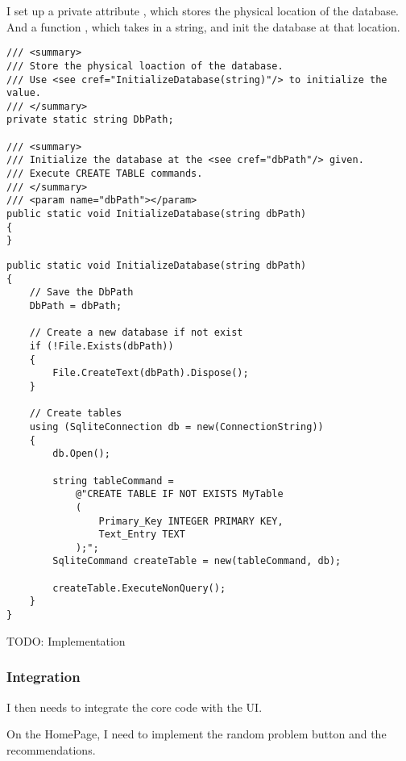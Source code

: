 \documentclass[report.tex]{subfiles}
\begin{document}
I set up a private attribute , which stores the physical location of the database. And a function , which takes in a string, and init the database at that location.

\begin{verbatim}
/// <summary>
/// Store the physical loaction of the database.
/// Use <see cref="InitializeDatabase(string)"/> to initialize the value.
/// </summary>
private static string DbPath;

/// <summary>
/// Initialize the database at the <see cref="dbPath"/> given.
/// Execute CREATE TABLE commands.
/// </summary>
/// <param name="dbPath"></param>
public static void InitializeDatabase(string dbPath)
{
}
\end{verbatim}

\begin{verbatim}
public static void InitializeDatabase(string dbPath)
{
    // Save the DbPath
    DbPath = dbPath;

    // Create a new database if not exist
    if (!File.Exists(dbPath))
    {
        File.CreateText(dbPath).Dispose();
    }

    // Create tables
    using (SqliteConnection db = new(ConnectionString))
    {
        db.Open();

        string tableCommand =
            @"CREATE TABLE IF NOT EXISTS MyTable 
            (
                Primary_Key INTEGER PRIMARY KEY,
                Text_Entry TEXT
            );";
        SqliteCommand createTable = new(tableCommand, db);

        createTable.ExecuteNonQuery();
    }
}
\end{verbatim}

TODO: Implementation

\subsubsection{Integration}

I then needs to integrate the core code with the UI.

On the HomePage, I need to implement the random problem button and the recommendations.
\end{document}
